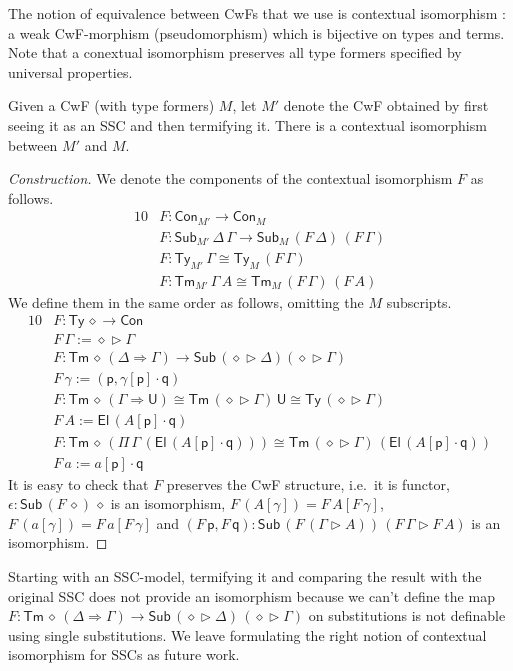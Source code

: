 \documentclass[sigplan,10pt,anonymous,review]{acmart}\settopmatter{printfolios=true,printccs=false,printacmref=false}
\newcommand{\ra}{\rightarrow}
\newcommand{\Ra}{\Rightarrow}
\newcommand{\Ty}{\mathsf{Ty}}
\newcommand{\Tm}{\mathsf{Tm}}
\newcommand{\Con}{\mathsf{Con}}
\newcommand{\Sub}{\mathsf{Sub}}
\newcommand{\p}{\mathsf{p}}
\newcommand{\q}{\mathsf{q}}
\newcommand{\ext}{\mathop{\triangleright}}
\newcommand{\U}{\mathsf{U}}
\newcommand{\El}{\mathsf{El}}
\begin{document}
The notion of equivalence between CwFs that we use is contextual
isomorphism \cite{DBLP:journals/corr/abs-2211-07487}: a weak
CwF-morphism (pseudomorphism) which is bijective on types and
terms. Note that a conextual isomorphism preserves all type formers
specified by universal properties.
\begin{problem}
  Given a CwF (with type formers) $M$, let $M'$ denote the CwF
  obtained by first seeing it as an SSC and then termifying it. There
  is a contextual isomorphism between $M'$ and $M$.
\end{problem}
\begin{proof}[Construction]
  We denote the components of the contextual isomorphism $F$ as follows.
  \begin{alignat*}{10}
    & F : \Con_{M'}\ra\Con_M \\
    & F : \Sub_{M'}\,\Delta\,\Gamma\ra\Sub_M\,(F\,\Delta)\,(F\,\Gamma) \\
    & F : \Ty_{M'}\,\Gamma \cong \Ty_M\,(F\,\Gamma) \\
    & F : \Tm_{M'}\,\Gamma\,A \cong \Tm_M\,(F\,\Gamma)\,(F\,A)
  \end{alignat*}
  We define them in the same order as follows, omitting the $M$ subscripts.
  \begin{alignat*}{10}
    & F : \Ty\,\diamond\ra\Con \\
    & F\,\Gamma := \diamond\ext\Gamma \\
    & F : \Tm\,\diamond\,(\Delta\Ra\Gamma) \ra \Sub\,(\diamond\ext\Delta) (\diamond\ext\Gamma) \\
    & F\,\gamma := (\p,\gamma[\p]\cdot\q) \\
    & F : \Tm\,\diamond\,(\Gamma\Ra\U) \cong \Tm\,(\diamond\ext\Gamma)\,\U \cong \Ty\,(\diamond\ext\Gamma) \\
    & F\,A := \El\,(A[\p]\cdot\q) \\
    & F : \Tm\,\diamond\,(\Pi\,\Gamma\,(\El\,(A[\p]\cdot\q))) \cong \Tm\,(\diamond\ext\Gamma)\,(\El\,(A[\p]\cdot\q)) \\
    & F\,a := a[\p]\cdot\q
  \end{alignat*}
  It is easy to check that $F$ preserves the CwF structure, i.e.\ it
  is functor, $\epsilon : \Sub\,(F\,\diamond)\,\diamond$ is an
  isomorphism, $F\,(A[\gamma]) = F\,A[F\,\gamma]$, $F\,(a[\gamma]) =
  F\,a[F\,\gamma]$ and $(F\,\p,F\,\q) : \Sub\,(F\,(\Gamma\ext
  A))\,(F\,\Gamma\ext F\,A)$ is an isomorphism.
\end{proof}
Starting with an SSC-model, termifying it and comparing the result
with the original SSC does not provide an isomorphism because we can't
define the map $F : \Tm\,\diamond\,(\Delta\Ra\Gamma) \ra
\Sub\,(\diamond\ext\Delta)\,(\diamond\ext\Gamma)$ on substitutions is
not definable using single substitutions. We leave formulating the
right notion of contextual isomorphism for SSCs as future work.
\end{document}
